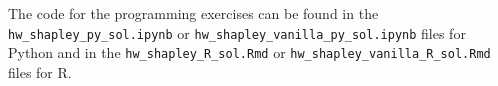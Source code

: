 \documentclass[a4paper]{article}
\begin{document}

The code for the programming exercises can be found in the \texttt{hw\_shapley\_py\_sol.ipynb} or \texttt{hw\_shapley\_vanilla\_py\_sol.ipynb} files for Python and in the \texttt{hw\_shapley\_R\_sol.Rmd} or \texttt{hw\_shapley\_vanilla\_R\_sol.Rmd} files for R.




% 


% 

\dlz


\end{document}
